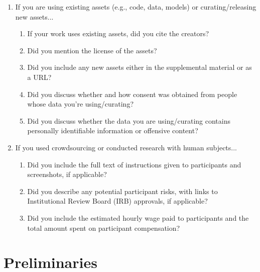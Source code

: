 \documentclass{article}
\begin{document}
\begin{enumerate}
\item If you are using existing assets (e.g., code, data, models) or curating/releasing new assets...
\begin{enumerate}
  \item If your work uses existing assets, did you cite the creators?
    \answerYes
  \item Did you mention the license of the assets?
    \answerNA{}
  \item Did you include any new assets either in the supplemental material or as a URL?
    \answerNA{}
  \item Did you discuss whether and how consent was obtained from people whose data you're using/curating?
    \answerNA{}
  \item Did you discuss whether the data you are using/curating contains personally identifiable information or offensive content?
    \answerNA{}
\end{enumerate}


\item If you used crowdsourcing or conducted research with human subjects...
\begin{enumerate}
  \item Did you include the full text of instructions given to participants and screenshots, if applicable?
    \answerNA{}
  \item Did you describe any potential participant risks, with links to Institutional Review Board (IRB) approvals, if applicable?
    \answerNA{}
  \item Did you include the estimated hourly wage paid to participants and the total amount spent on participant compensation?
    \answerNA{}
\end{enumerate}


\end{enumerate}




\clearpage
\appendix
\section{Preliminaries} \label{Appendix: Preliminaries}

\end{document}
